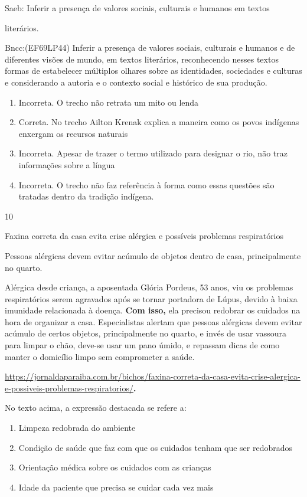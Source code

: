 {{\begin{itemize}
\begin{itemize}
Saeb: Inferir a presença de valores sociais, culturais e humanos em
textos

literários.

Bncc:(EF69LP44) Inferir a presença de valores sociais, culturais e
humanos e de diferentes visões de mundo, em textos literários,
reconhecendo nesses textos formas de estabelecer múltiplos olhares sobre
as identidades, sociedades e culturas e considerando a autoria e o
contexto social e histórico de sua produção.

\begin{enumerate}
\def\labelenumi{\arabic{enumi}.}
\item
  Incorreta. O trecho não retrata um mito ou lenda
\item
  Correta. No trecho Ailton Krenak explica a maneira como os povos
  indígenas enxergam os recursos naturais
\item
  Incorreta. Apesar de trazer o termo utilizado para designar o rio, não
  traz informações sobre a língua
\item
  Incorreta. O trecho não faz referência à forma como essas questões são
  tratadas dentro da tradição indígena.
\end{enumerate}

\num{10}

Faxina correta da casa evita crise alérgica e possíveis problemas
respiratórios

Pessoas alérgicas devem evitar acúmulo de objetos dentro de casa,
principalmente no quarto.

Alérgica desde criança, a aposentada Glória Pordeus, 53 anos, viu os
problemas respiratórios serem agravados após se tornar portadora de
Lúpus, devido à baixa imunidade relacionada à doença. \textbf{Com isso,}
ela precisou redobrar os cuidados na hora de organizar a casa.
Especialistas alertam que pessoas alérgicas devem evitar acúmulo de
certos objetos, principalmente no quarto, e invés de usar vassoura para
limpar o chão, deve-se usar um pano úmido, e repassam dicas de como
manter o domicílio limpo sem comprometer a saúde.

\href{https://jornaldaparaiba.com.br/bichos/faxina-correta-da-casa-evita-crise-alergica-e-possiveis-problemas-respiratorios/}{\uline{https://jornaldaparaiba.com.br/bichos/faxina-correta-da-casa-evita-crise-alergica-e-possiveis-problemas-respiratorios/}}\textbf{.}

No texto acima, a expressão destacada se refere a:

\begin{enumerate}
\def\labelenumi{\alph{enumi})}
\item
  Limpeza redobrada do ambiente
\item
  Condição de saúde que faz com que os cuidados tenham que ser
  redobrados
\item
  Orientação médica sobre os cuidados com as crianças
\item
  Idade da paciente que precisa se cuidar cada vez mais
\end{enumerate}


\end{itemize}
\end{itemize}}}
